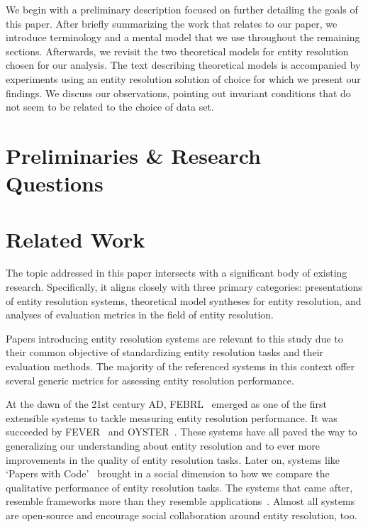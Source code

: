 \documentclass[journal]{IEEEtran}
\begin{document}
    We begin with a preliminary description focused on further detailing the
    goals of this paper.
    After briefly summarizing the work that relates to our paper, we introduce
    terminology and a mental model that we use throughout the remaining
    sections.
    Afterwards, we revisit the two theoretical models for entity resolution
    chosen for our analysis.
    The text describing theoretical models is accompanied by experiments using
    an entity resolution solution of choice for which we present our findings.
    We discuss our observations, pointing out invariant conditions that do not
    seem to be related to the choice of data set.

    \section[preliminaries-questions]{Preliminaries \& Research Questions}
    \label{sec:preliminaries-questions}
    

    \section{Related Work}\label{sec:related}
    
    The topic addressed in this paper intersects with a significant body of
    existing research.
    Specifically, it aligns closely with three primary categories: presentations
    of entity resolution systems, theoretical model syntheses for entity
    resolution, and analyses of evaluation metrics in the field of entity
    resolution.

    Papers introducing entity resolution systems are relevant to this study due
    to their common objective of standardizing entity resolution tasks and their
    evaluation methods.
    The majority of the referenced systems in this context offer several generic
    metrics for assessing entity resolution performance.

    At the dawn of the 21st century AD, FEBRL~\cite{febrl2002} emerged as one of
    the first extensible systems to tackle measuring entity resolution
    performance.
    It was succeeded by FEVER~\cite{fever2009} and OYSTER~\cite{oyster2012}.
    These systems have all paved the way to generalizing our understanding about
    entity resolution and to ever more improvements in the quality of entity
    resolution tasks.
    Later on, systems like `Papers with Code'~\cite{papwithcode2019} brought in
    a social dimension to how we compare the qualitative performance of entity
    resolution tasks.
    The systems that came after, resemble frameworks more than they resemble
    applications~\cite{magellan2020,jedai2017}.
    Almost all systems are open-source and encourage social collaboration around
    entity resolution, too.
    
\end{document}
